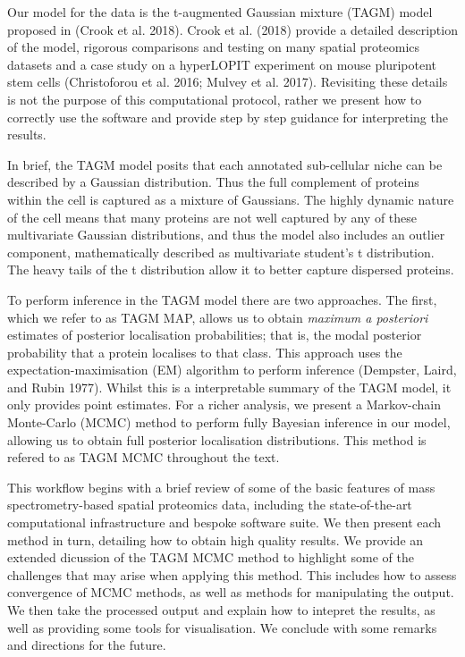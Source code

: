 \documentclass[]{article}
\begin{document}
Our model for the data is the t-augmented Gaussian mixture (TAGM) model
proposed in (Crook et al. 2018). Crook et al. (2018) provide a detailed
description of the model, rigorous comparisons and testing on many
spatial proteomics datasets and a case study on a hyperLOPIT experiment
on mouse pluripotent stem cells (Christoforou et al. 2016; Mulvey et al.
2017). Revisiting these details is not the purpose of this computational
protocol, rather we present how to correctly use the software and
provide step by step guidance for interpreting the results.

In brief, the TAGM model posits that each annotated sub-cellular niche
can be described by a Gaussian distribution. Thus the full complement of
proteins within the cell is captured as a mixture of Gaussians. The
highly dynamic nature of the cell means that many proteins are not well
captured by any of these multivariate Gaussian distributions, and thus
the model also includes an outlier component, mathematically described
as multivariate student's t distribution. The heavy tails of the t
distribution allow it to better capture dispersed proteins.

To perform inference in the TAGM model there are two approaches. The
first, which we refer to as TAGM MAP, allows us to obtain \emph{maximum
a posteriori} estimates of posterior localisation probabilities; that
is, the modal posterior probability that a protein localises to that
class. This approach uses the expectation-maximisation (EM) algorithm to
perform inference (Dempster, Laird, and Rubin 1977). Whilst this is a
interpretable summary of the TAGM model, it only provides point
estimates. For a richer analysis, we present a Markov-chain Monte-Carlo
(MCMC) method to perform fully Bayesian inference in our model, allowing
us to obtain full posterior localisation distributions. This method is
refered to as TAGM MCMC throughout the text.

This workflow begins with a brief review of some of the basic features
of mass spectrometry-based spatial proteomics data, including the
state-of-the-art computational infrastructure and bespoke software
suite. We then present each method in turn, detailing how to obtain high
quality results. We provide an extended dicussion of the TAGM MCMC
method to highlight some of the challenges that may arise when applying
this method. This includes how to assess convergence of MCMC methods, as
well as methods for manipulating the output. We then take the processed
output and explain how to intepret the results, as well as providing
some tools for visualisation. We conclude with some remarks and
directions for the future.
\end{document}
